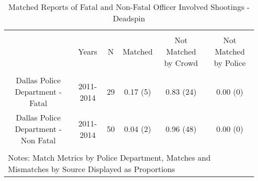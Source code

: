
\begin{table}[!htbp] \centering 
  \caption{Matched Reports of Fatal and Non-Fatal Officer Involved Shootings - Deadspin} 
  \label{} 
\footnotesize 
\begin{tabular}{@{\extracolsep{5pt}} cccccc} 
\\[-1.8ex]\hline 
\hline \\[-1.8ex] 
 & Years & N & Matched & Not Matched by Crowd & Not Matched by Police \\ 
\hline \\[-1.8ex] 
Dallas Police Department - Fatal & 2011-2014 & 29 & 0.17 (5) & 0.83 (24) & 0.00 (0) \\ 
Dallas Police Department - Non Fatal & 2011-2014 & 50 & 0.04 (2) & 0.96 (48) & 0.00 (0) \\ 
\hline \\[-1.8ex] 
\multicolumn{6}{l}{Notes: Match Metrics by Police Department, Matches and Mismatches by Source Displayed as Proportions} \\ 
\end{tabular} 
\end{table}  
